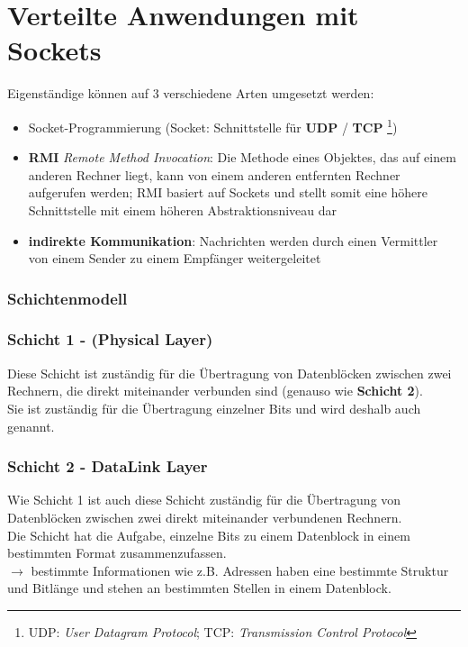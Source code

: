 \chapter{Verteilte Anwendungen mit Sockets}

Eigenständige  können auf 3 verschiedene Arten umgesetzt werden:

\begin{itemize}
    \item Socket-Programmierung (Socket: Schnittstelle für \textbf{UDP} / \textbf{TCP} \footnote{
    UDP: \textit{User Datagram Protocol}; TCP: \textit{Transmission Control Protocol}
    })
    \item \textbf{RMI} \textit{Remote Method Invocation}: Die Methode eines Objektes, das auf einem anderen Rechner liegt, kann von einem anderen entfernten Rechner aufgerufen werden; RMI basiert auf Sockets und stellt somit eine höhere Schnittstelle mit einem höheren Abstraktionsniveau dar
    \item \textbf{indirekte Kommunikation}: Nachrichten werden durch einen Vermittler von einem Sender zu einem Empfänger weitergeleitet
\end{itemize}


\subsection{Schichtenmodell}


\subsection*{Schicht 1 - (Physical Layer)}

Diese Schicht ist zuständig für die Übertragung von Datenblöcken zwischen zwei Rechnern, die direkt miteinander verbunden sind (genauso wie \textbf{Schicht 2}).\\
Sie ist zuständig für die Übertragung einzelner Bits und wird deshalb auch  genannt.

\subsection*{Schicht 2 - DataLink Layer}

Wie Schicht 1 ist auch diese Schicht zuständig für die Übertragung von Datenblöcken zwischen zwei direkt miteinander verbundenen Rechnern.\\

Die Schicht hat die Aufgabe, einzelne Bits zu einem Datenblock in einem bestimmten Format zusammenzufassen.\\
$\rightarrow$ bestimmte Informationen wie z.B. Adressen haben eine bestimmte Struktur und Bitlänge und stehen an bestimmten Stellen in einem Datenblock.\\

